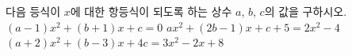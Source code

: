다음 등식이 $x$에 대한 항등식이 되도록 하는 상수 $a$, $b$, $c$의 값을 구하시오.
 $(a-1)x^2+(b+1)x+c=0$
 $ax^2+(2b-1)x+c+5=2x^2-4$
 $(a+2)x^2+(b-3)x+4c=3x^2-2x+8$
